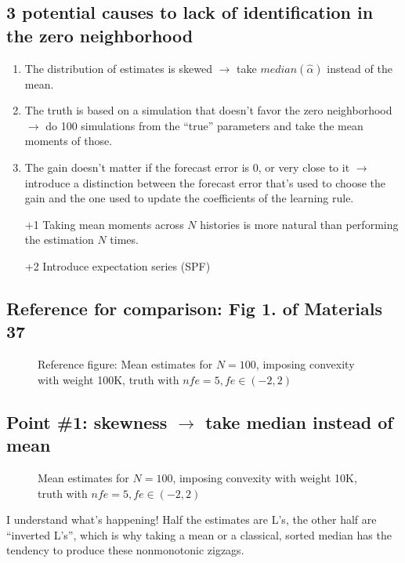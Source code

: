 \documentclass[11pt]{article}
\def \myFigPath {../../figures/}
\renewcommand{\[}{\begin{equation}}
\renewcommand{\]}{\end{equation}}
\def\mySmallFigScale{0.22}
\def\mySmallerFigScale{0.18}
\def\myTinyFigScale{0.16}
\begin{document}
\subsection*{3 potential causes to lack of identification in the zero neighborhood}
\begin{enumerate}
\item The distribution of estimates is skewed $\rightarrow$ take $median(\hat{\alpha})$ instead of the mean.
\item The truth is based on a simulation that doesn't favor the zero neighborhood $\rightarrow$ do 100 simulations from the ``true'' parameters and take the mean moments of those.
\item The gain doesn't matter if the forecast error is 0, or very close to it $\rightarrow$ introduce a distinction between the forecast error that's used to choose the gain and the one used to update the coefficients of the learning rule.
\item[+1] Taking mean moments across $N$ histories is more natural than performing the estimation $N$ times.
\item[+2] Introduce expectation series (SPF)
\end{enumerate}

\subsection*{Reference for comparison: Fig 1. of Materials 37}

\begin{figure}[h!]
\hfill
{}
\caption{Reference figure: Mean estimates for $N=100$, imposing convexity with weight 100K, truth with $nfe=5, fe \in(-2,2)$}
\end{figure}

\newpage 
\subsection*{Point \#1: skewness $\rightarrow$ take median instead of mean }

\begin{figure}[h!]
\caption{Mean estimates for $N=100$, imposing convexity with weight 10K, truth with $nfe=5, fe \in(-2,2)$}
\end{figure}
I understand what's happening! Half the estimates are L's, the other half are ``inverted L's'', which is why taking a mean or a classical, sorted median has the tendency to produce these nonmonotonic zigzags.
\end{document}
